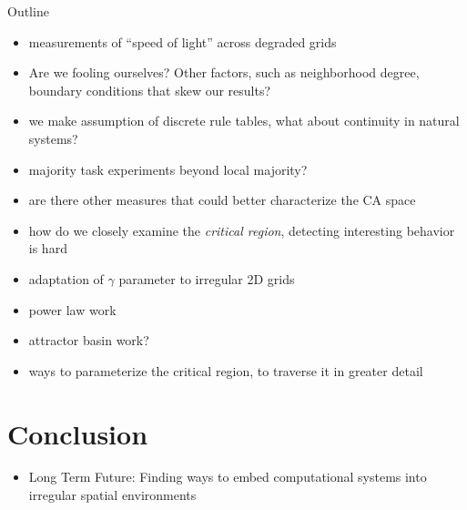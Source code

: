 \documentclass[a4paper,11pt,twoside]{report}
\begin{document}
Outline
\begin{itemize}

\item measurements of ``speed of light'' across degraded grids
\item Are we fooling ourselves? Other factors, such as neighborhood degree, boundary conditions that skew our results?

\item we make assumption of discrete rule tables, what about continuity in natural systems?

\item majority task experiments beyond local majority?

\item are there other measures that could better characterize the CA space
\item how do we closely examine the \textit{critical region}, detecting interesting behavior is hard
\item adaptation of $\gamma$ parameter to irregular 2D grids
\item power law work
\item attractor basin work?
\item ways to parameterize the critical region, to traverse it in greater detail

\end{itemize}

\chapter{Conclusion}
\label{ch:conclusion}

\begin{itemize}
\item Long Term Future: Finding ways to embed computational systems into irregular spatial environments
\end{itemize}
\end{document}
